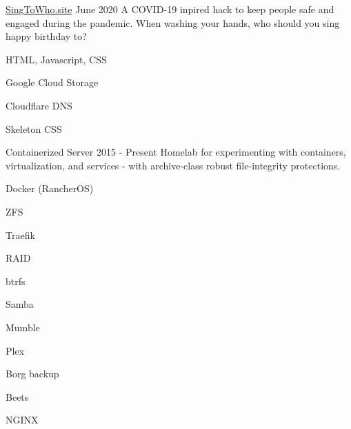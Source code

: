 

\begin{cventries}

  \cventry%
    {} %
    {\href{https://singtowho.site}{SingToWho.site}} %
    {} %
    {June 2020} %
    {A COVID-19 inpired hack to keep people safe and engaged during the pandemic. When washing your hands, who should you sing happy birthday to?}
    \begin{cventryskills}
      \item HTML, Javascript, CSS
      \item Google Cloud Storage
      \item Cloudflare DNS
      \item Skeleton CSS
    \end{cventryskills}

  \cventry%
    {} %
    {Containerized Server} %
    {} %
    {2015 \-- Present} %
    {Homelab for experimenting with containers, virtualization, and services \-- with archive-class robust file-integrity protections.}
    \begin{cventryskills}
      \item Docker (RancherOS)
      \item ZFS
      \item Traefik
      \item RAID
      \item btrfs
      \item Samba
      \item Mumble
      \item Plex
      \item Borg backup
      \item Beets
      \item NGINX
    \end{cventryskills}

\end{cventries}
